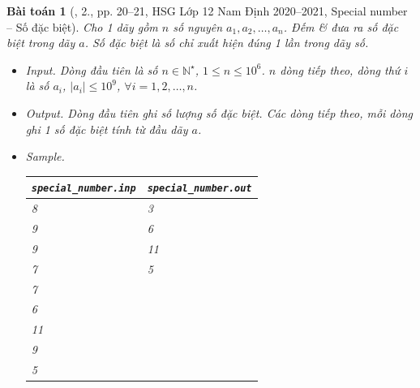 \documentclass{article}
\newtheorem{baitoan}{Bài toán}
\begin{document}
\begin{baitoan}[\cite{Trung_HSG_THPT_Tin}, 2., pp. 20--21, HSG Lớp 12 Nam Định 2020--2021, Special number -- Số đặc biệt]
	Cho 1 dãy gồm $n$ số nguyên $a_1,a_2,\ldots,a_n$. Đếm \& đưa ra số đặc biệt trong dãy $a$. {\rm Số đặc biệt} là số chỉ xuất hiện đúng 1 lần trong dãy số.
	\begin{itemize}
		\item {\sf Input.} Dòng đầu tiên là số $n\in\mathbb{N}^\star$, $1\le n\le10^6$. $n$ dòng tiếp theo, dòng thứ $i$ là số $a_i$, $|a_i|\le10^9$, $\forall i = 1,2,\ldots,n$.
		\item {\sf Output.} Dòng đầu tiên ghi số lượng số đặc biệt. Các dòng tiếp theo, mỗi dòng ghi 1 số đặc biệt tính từ đầu dãy $a$.
		\item {\sf Sample.}
		\begin{table}[H]
			\centering
			\begin{tabular}{|l|l|}
				\hline
				\verb|special_number.inp| & \verb|special_number.out| \\
				\hline
				8 & 3 \\
				9 & 6 \\
				9 & 11 \\
				7 & 5 \\
				7 & \\
				6 & \\
				11 & \\
				9 & \\
				5 & \\
				\hline
			\end{tabular}
		\end{table}
	\end{itemize}
\end{baitoan}
\end{document}
